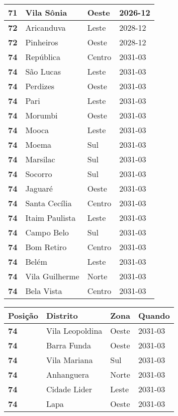 \begin{table}[H]
\begin{tabular}{l|l|l|l}
		\textbf{71} & Vila Sônia & Oeste & 2026-12\\ \hline
		\textbf{72} & Aricanduva & Leste & 2028-12\\ \hline
		\textbf{72} & Pinheiros & Oeste & 2028-12\\ \hline
		\textbf{74} & República & Centro & 2031-03\\ \hline
		\textbf{74} & São Lucas & Leste & 2031-03\\ \hline
		\textbf{74} & Perdizes & Oeste & 2031-03\\ \hline
		\textbf{74} & Pari & Leste & 2031-03\\ \hline
		\textbf{74} & Morumbi & Oeste & 2031-03\\ \hline
		\textbf{74} & Mooca & Leste & 2031-03\\ \hline
		\textbf{74} & Moema & Sul & 2031-03\\ \hline
		\textbf{74} & Marsilac & Sul & 2031-03\\ \hline
		\textbf{74} & Socorro & Sul & 2031-03\\ \hline
		\textbf{74} & Jaguaré & Oeste & 2031-03\\ \hline
		\textbf{74} & Santa Cecília & Centro & 2031-03\\ \hline
		\textbf{74} & Itaim Paulista & Leste & 2031-03\\ \hline
		\textbf{74} & Campo Belo & Sul & 2031-03\\ \hline
		\textbf{74} & Bom Retiro & Centro & 2031-03\\ \hline
		\textbf{74} & Belém & Leste & 2031-03\\ \hline
		\textbf{74} & Vila Guilherme & Norte & 2031-03\\ \hline
		\textbf{74} & Bela Vista & Centro & 2031-03\\ 	
	\end{tabular}
\end{table}

\begin{table}[H]
	\centering
	\begin{tabular}{l|l|l|l}
	\textbf{Posição} & \textbf{Distrito} & \textbf{Zona} & \textbf{Quando} \\ \hline
	\textbf{74} & Vila Leopoldina & Oeste & 2031-03\\ \hline
	\textbf{74} & Barra Funda & Oeste & 2031-03\\ \hline
	\textbf{74} & Vila Mariana & Sul & 2031-03\\ \hline
	\textbf{74} & Anhanguera & Norte & 2031-03\\ \hline
	\textbf{74} & Cidade Lider & Leste & 2031-03\\ \hline
	\textbf{74} & Lapa & Oeste & 2031-03\\	
	\end{tabular}
\end{table}

